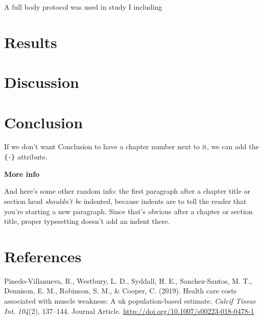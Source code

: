 \documentclass[twoside,10pt]{gihclass} %
\begin{document}
A full body protocol was used in study I including

\hypertarget{results}{%
\chapter{Results}\label{results}}

\hypertarget{discussion}{%
\chapter{Discussion}\label{discussion}}

\hypertarget{conclusion}{%
\chapter*{Conclusion}\label{conclusion}}

If we don't want Conclusion to have a chapter number next to it, we can add the \texttt{\{-\}} attribute.

\textbf{More info}

And here's some other random info: the first paragraph after a chapter title or section head \emph{shouldn't be} indented, because indents are to tell the reader that you're starting a new paragraph. Since that's obvious after a chapter or section title, proper typesetting doesn't add an indent there.

\backmatter

\hypertarget{references}{%
\chapter*{References}\label{references}}


\noindent

\setlength{\parindent}{-0.20in}
\setlength{\leftskip}{0.20in}
\setlength{\parskip}{8pt}

\hypertarget{refs}{}
\leavevmode\hypertarget{ref-RN2184}{}%
Pinedo-Villanueva, R., Westbury, L. D., Syddall, H. E., Sanchez-Santos, M. T., Dennison, E. M., Robinson, S. M., \& Cooper, C. (2019). Health care costs associated with muscle weakness: A uk population-based estimate. \emph{Calcif Tissue Int}, \emph{104}(2), 137--144. Journal Article. \url{http://doi.org/10.1007/s00223-018-0478-1}


\end{document}

